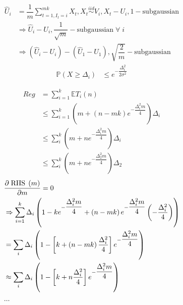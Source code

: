 \documentclass{article}
\begin{document}
\begin{align*}
\hat{U}_{i} &= \dfrac{1}{m} \displaystyle\sum_{t = 1, I_{t} = i}^{m k} X_{t}, X_{t} \stackrel{iid}{\sim} V_{i}, X_{t} - U_{i}, 1-\text{subgaussian}
\\ &\Rightarrow  \hat{U}_{i} - U_{i}, \dfrac{1}{\sqrt{m}}-\text{subgaussian} \;\forall\; i 
\\ &\Rightarrow  \left(\hat{U}_{i} - U_{i}\right) - \left(\hat{U}_{1} - U_{1}\right), \sqrt{\dfrac{2}{m}}-\text{subgaussian}
\end{align*}
\begin{align*}
\mathbb{P}\left(X \geq  \Delta_{i}\right) &\leq  e^{- \dfrac{\Delta_{i}^{2}}{2 \sigma^{2}}}
\end{align*}
\begin{figure}[H] \centering {} 
\end{figure}
\begin{align*}
Reg  &= \displaystyle\sum_{i=1}^{k} \mathbb{E} T_{i}\left(n\right)
\\ &\leq  \displaystyle\sum_{i=1}^{k} \left(m + \left(n - m k\right) e^{- \dfrac{\Delta_{i}^{2} m}{4}}\right) \Delta_{i}
\\ &\leq  \displaystyle\sum_{i}^{k} \left(m + n e^{- \dfrac{\Delta_{i}^{2} m}{4}}\right) \Delta_{i}
\\ &\leq  \displaystyle\sum_{i}^{k} \left(m + n e^{- \dfrac{\Delta_{2}^{2} m}{4}}\right) \Delta_{2}
\end{align*}
\begin{align*}
&  \dfrac{\partial \text{\;RHS\;}\left(m \right)}{\partial m} = 0
\\ &\Rightarrow  \displaystyle\sum_{i=1}^{k} \Delta_{i} \left(1 - k e^{- \dfrac{\Delta_{i}^{2} m}{4}} + \left(n - m k\right) e^{- \dfrac{\Delta_{i}^{2} m}{4}} \left(- \dfrac{\Delta_{i}^{2}}{4}\right)\right)
\\ &= \displaystyle\sum_{i} \Delta_{i} \left(1 - \left[k + \left(n - m k\right) \dfrac{\Delta_{i}^{2}}{4} \right] e^{- \dfrac{\Delta_{i}^{2} m}{4}}\right)
\\ &\approx  \displaystyle\sum_{i} \Delta_{i} \left(1 - \left[k + n \dfrac{\Delta_{i}^{2}}{4} \right] e^{- \dfrac{\Delta_{i}^{2} m}{4}}\right)
\\ &  ...
\end{align*}
\end{document}
